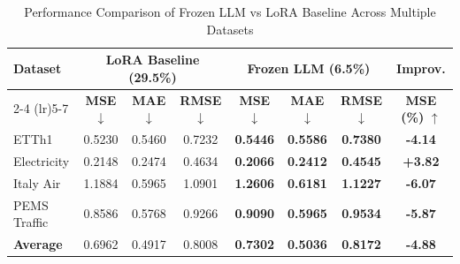 \begin{table}[t]
\centering
\caption{Performance Comparison of Frozen LLM vs LoRA Baseline Across Multiple Datasets}
\label{tab:multi_dataset_results}
\begin{tabular}{lccccccc}
\toprule
\textbf{Dataset} & \multicolumn{3}{c}{\textbf{LoRA Baseline (29.5\%)}} & \multicolumn{3}{c}{\textbf{Frozen LLM (6.5\%)}} & \textbf{Improv.} \\
\cmidrule(lr){2-4} \cmidrule(lr){5-7}
& \textbf{MSE} $\downarrow$ & \textbf{MAE} $\downarrow$ & \textbf{RMSE} $\downarrow$ & \textbf{MSE} $\downarrow$ & \textbf{MAE} $\downarrow$ & \textbf{RMSE} $\downarrow$ & \textbf{MSE (\%)} $\uparrow$ \\
\midrule
ETTh1 & 0.5230 & 0.5460 & 0.7232 & \textbf{0.5446} & \textbf{0.5586} & \textbf{0.7380} & \textbf{-4.14} \\
Electricity & 0.2148 & 0.2474 & 0.4634 & \textbf{0.2066} & \textbf{0.2412} & \textbf{0.4545} & \textbf{+3.82} \\
Italy Air & 1.1884 & 0.5965 & 1.0901 & \textbf{1.2606} & \textbf{0.6181} & \textbf{1.1227} & \textbf{-6.07} \\
PEMS Traffic & 0.8586 & 0.5768 & 0.9266 & \textbf{0.9090} & \textbf{0.5965} & \textbf{0.9534} & \textbf{-5.87} \\
\midrule
\textbf{Average} & 0.6962 & 0.4917 & 0.8008 & \textbf{0.7302} & \textbf{0.5036} & \textbf{0.8172} & \textbf{-4.88} \\
\bottomrule
\end{tabular}
\end{table}
